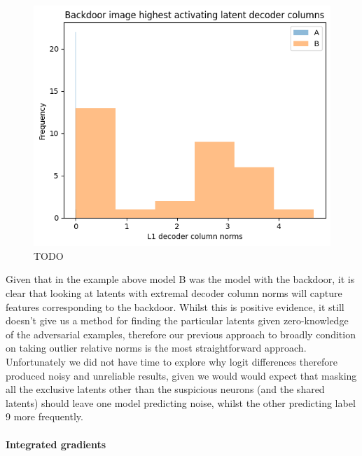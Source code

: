 \documentclass[letterpaper]{article} %
\begin{document}
\begin{figure}[h!]
\centering
\includegraphics[width=\columnwidth]{figures/round_1_decoder_norms.png}
\caption{TODO}
\end{figure}

Given that in the example above model B was the model with the backdoor, it is clear that looking at latents with extremal decoder column norms will capture features corresponding to the backdoor. Whilst this is positive evidence, it still doesn't give us a method for finding the particular latents given zero-knowledge of the adversarial examples, therefore our previous approach to broadly condition on taking outlier relative norms is the most straightforward approach. Unfortunately we did not have time to explore why logit differences therefore produced noisy and unreliable results, given we would would expect that masking all the exclusive latents other than the suspicious neurons (and the shared latents) should leave one model predicting noise, whilst the other predicting  label 9 more frequently.

\paragraph{Integrated gradients}
\end{document}
